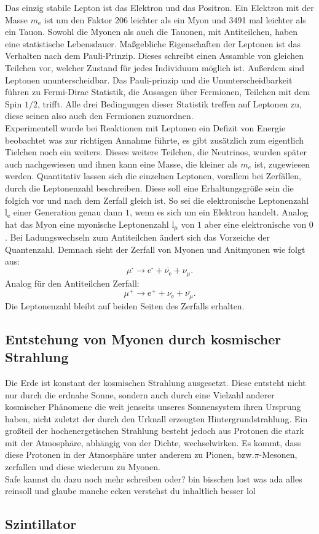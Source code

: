 Das einzig stabile Lepton ist das Elektron und das Positron. Ein Elektron mit der Masse $m_\text{e}$ ist um den Faktor 206 leichter als ein Myon und 3491 mal leichter als ein Tauon. 
Sowohl die Myonen als auch die Tauonen, mit Antiteilchen, haben eine statistische Lebensdauer. Maßgebliche Eigenschaften der
Leptonen ist das Verhalten nach dem Pauli-Prinzip. Dieses schreibt einen Assamble von gleichen Teilchen vor, welcher Zustand für jedes Individuum möglich ist. Außerdem sind Leptonen 
ununterscheidbar.  Das Pauli-prinzip und die Ununterscheidbarkeit führen zu Fermi-Dirac Statistik, die Aussagen über Fermionen, Teilchen mit dem Spin $1/2$, trifft. Alle drei Bedingungen dieser Statistik
treffen auf Leptonen zu, diese seinen also auch den Fermionen zuzuordnen.  
\\
\newline
Experimentell wurde bei Reaktionen mit Leptonen ein Defizit von Energie beobachtet was zur richtigen Annahme führte, es gibt zusätzlich zum eigentlich Tielchen noch ein weiters. 
Dieses weitere Teilchen, die Neutrinos, wurden später auch nachgewiesen und ihnen kann eine Masse, die kleiner als $m_e$ ist, zugewiesen werden.
Quantitativ lassen sich die einzelnen Leptonen, vorallem bei Zerfällen, durch die Leptonenzahl beschreiben. Diese soll eine Erhaltungsgröße sein
die folgich vor und nach dem Zerfall gleich ist. So sei die elektronische Leptonenzahl $\text{l}_\text{e}$ einer Generation genau dann $1$, wenn es sich um ein Elektron handelt. 
Analog hat das Myon eine myonische Leptonenzahl $\text{l}_\mu$ von $1$ aber eine elektronische von $0$. Bei Ladungswechseln zum Antiteilchen ändert sich das Vorzeiche der Quantenzahl.
Demnach sieht der Zerfall von Myonen und Anitmyonen wie folgt aus:
\begin{equation*}
    \mu^\text{-} \rightarrow \text{e}^\text{-} + \bar{\nu_\text{e}} + \nu_\mu.
\end{equation*}
Analog für den Antiteilchen Zerfall:
\begin{equation*}
    \mu^\text{+} \rightarrow \text{e}^\text{+} + \nu_\text{e} + \bar{\nu_\mu}.
\end{equation*}
Die Leptonenzahl bleibt auf beiden Seiten des Zerfalls erhalten. 

\subsection{Entstehung von Myonen durch kosmischer Strahlung}
Die Erde ist konstant der kosmischen Strahlung ausgesetzt. Diese entsteht nicht nur durch die erdnahe Sonne, sondern auch durch eine Vielzahl anderer kosmischer Phänomene die weit jenseits unseres Sonnensystem ihren Ursprung haben, nicht zuletzt der
durch den Urknall erzeugten Hintergrundstrahlung. Ein großteil der hochenergetischen Strahlung besteht jedoch aus Protonen die stark mit der Atmosphäre, abhängig von der Dichte, wechselwirken.
Es kommt, dass diese Protonen in der Atmosphäre unter anderem zu Pionen, bzw.$\pi$-Mesonen, zerfallen und diese wiederum zu Myonen. 
\\
\newline
Safe kannst du dazu noch mehr schreiben oder? bin bisschen lost was ada alles reinsoll und glaube manche ecken verstehst du inhaltlich besser lol

\subsection{Szintillator}